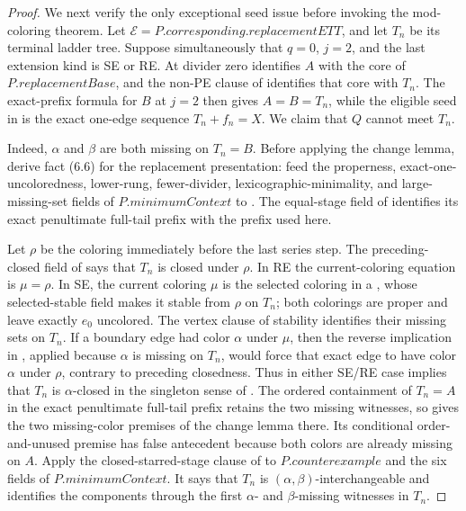 \begin{proof}
We next verify the only exceptional seed issue before invoking the
mod-coloring theorem.  Let \(\mathcal E=P.\mathit{corresponding}.
\mathit{replacementETT}\), and let \(T_n\) be its terminal ladder tree.
Suppose simultaneously that \(q=0\), \(j=2\), and the last extension kind
is SE or RE.  At divider zero  identifies
\(A\) with the core of \(P.\mathit{replacementBase}\), and the non-PE
clause of  identifies that core with \(T_n\).
The exact-prefix formula for \(B\) at \(j=2\) then gives \(A=B=T_n\),
while the eligible seed in
 is the exact one-edge sequence \(T_n+f_n=X\).
We claim that \(Q\) cannot meet \(T_n\).

Indeed, \(\alpha\) and \(\beta\) are both missing on \(T_n=B\).
Before applying the change lemma, derive fact (6.6) for the replacement
presentation: feed the properness, exact-one-uncoloredness, lower-rung,
fewer-divider, lexicographic-minimality, and large-missing-set fields of
\(P.\mathit{minimumContext}\) to
.  The equal-stage
field of  identifies its exact penultimate
full-tail prefix with the prefix used here.

Let \(\rho\) be the coloring immediately before the last series step.
The preceding-closed field of  says that
\(T_n\) is closed under \(\rho\).  In RE the current-coloring equation is
\(\mu=\rho\).  In SE, the current coloring \(\mu\) is the selected
coloring in a , whose selected-stable
field makes it stable from \(\rho\) on \(T_n\); both colorings are proper
and leave exactly \(e_0\) uncolored.  The vertex clause of stability
identifies their missing sets on \(T_n\).  If a boundary edge had color
\(\alpha\) under \(\mu\), then the reverse implication in
, applied because \(\alpha\) is missing on \(T_n\), would
force that exact edge to have color \(\alpha\) under \(\rho\), contrary
to preceding closedness.  Thus in either SE/RE case
 implies that \(T_n\) is
\(\alpha\)-closed in the singleton sense of
.  The ordered containment of \(T_n=A\) in
the exact penultimate full-tail prefix retains the two missing witnesses,
so  gives the two missing-color premises of the
change lemma there.  Its conditional order-and-unused premise has false
antecedent because both colors are already missing on \(A\).  Apply the
closed-starred-stage clause of  to
\(P.\mathit{counterexample}\) and the six fields of
\(P.\mathit{minimumContext}\).  It says that \(T_n\) is
\((\alpha,\beta)\)-interchangeable and identifies the components through
the first \(\alpha\)- and \(\beta\)-missing witnesses in \(T_n\).


\end{proof}
